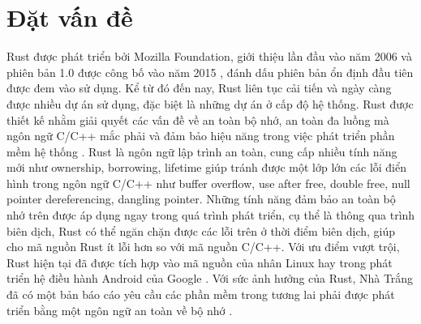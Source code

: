 \chapter{Đặt vấn đề}
\label{chap:introduction}

Rust được phát triển bởi Mozilla Foundation, giới thiệu lần đầu vào năm 2006 và phiên bản 1.0 được công bố vào năm 2015 \cite{seidel2024bringing}, đánh dấu phiên bản ổn định đầu tiên được đem vào sử dụng.
Kể từ đó đến nay, Rust liên tục cải tiến và ngày càng được nhiều dự án sử dụng, đặc biệt là những dự án ở cấp độ hệ thống.
Rust được thiết kế nhằm giải quyết các vấn đề về an toàn bộ nhớ, an toàn đa luồng mà ngôn ngữ C/C++ mắc phải và đảm bảo hiệu năng trong việc phát triển phần mềm hệ thống \cite{je2020scientists, stackoverflowStackOverflow}.
Rust là ngôn ngữ lập trình an toàn, cung cấp nhiều tính năng mới như ownership, borrowing, lifetime giúp tránh được một lớp lớn các lỗi điển hình trong ngôn ngữ C/C++ như buffer overflow, use after free, double free, null pointer dereferencing, dangling pointer.
Những tính năng đảm bảo an toàn bộ nhớ trên được áp dụng ngay trong quá trình phát triển, cụ thể là thông qua trình biên dịch, Rust có thể ngăn chặn được các lỗi trên ở thời điểm biên dịch, giúp cho mã nguồn Rust ít lỗi hơn so với mã nguồn C/C++.
Với ưu điểm vượt trội, Rust hiện tại đã được tích hợp vào mã nguồn của nhân Linux \cite{kernelRustx2014} hay trong phát triển hệ điều hành Android của Google \cite{androidAndroidRust, googleblogMemorySafe}.
Với sức ảnh hưởng của Rust, Nhà Trắng đã có một bản báo cáo yêu cầu các phần mềm trong tương lai phải được phát triển bằng một ngôn ngữ an toàn về bộ nhớ \cite{whitehousePressRelease}.


